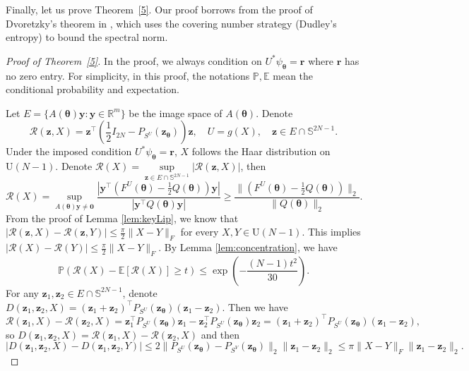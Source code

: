 \documentclass{amsart}
\theoremstyle{plain}
\theoremstyle{definition}
\theoremstyle{remark}
\newcommand{\thmref}[1]{Theorem~\ref{#1}}
\newcommand{\RR}{\mathbb{R}}
\newcommand{\PP}{\mathbb{P}}
\newcommand{\EE}{\mathbb{E}}
\begin{document}
Finally, let us prove \thmref{5}. Our proof borrows from the proof of Dvoretzky's theorem in \cite{meckes2019random}, which uses the covering number strategy (Dudley's entropy) to bound the spectral norm.
\begin{proof}[Proof of \thmref{5}]
     In the proof, we always condition on $U^*\psi_{\bm\theta}=\bm r$ where $\bm r$ has no zero entry. For simplicity, in this proof, the notations $\PP,\EE$ mean the conditional probability and expectation.  
     
     Let $E=\{A(\bm\theta)\bm{y}:\bm{y}\in\RR^{m}\}$ be the image space of $A(\bm\theta)$. Denote 
    \begin{equation}
        \label{aux}
        \mathcal{R}(\bm{z},X)=\bm{z}^\top(\frac{1}{2}I_{2N}-P_{S^U}(\bm{z}_{\bm\theta}))\bm{z},\quad U=g(X),\quad \bm{z}\in E\cap\mathbb{S}^{2N-1}.
    \end{equation}
    Under the imposed condition $U^*\psi_{\bm\theta}=\bm r$, $X$ follows the Haar distribution on $\mathrm U(N-1)$. Denote $\mathcal{R}(X)=\sup\limits_{\bm{z}\in E\cap\mathbb{S}^{2N-1}}|\mathcal{R}(\bm{z},X)|$, then 
    \begin{equation}
        \label{eq:upperbounf:R(X)}
         \mathcal{R}(X)=\sup\limits_{A(\bm\theta)\bm{y}\neq \bm 0}\frac{|\bm{y}^\top(F^U(\bm\theta)-\frac{1}{2}Q(\bm\theta))\bm{y}|}{|\bm{y}^\top Q(\bm\theta)\bm{y}|}\geq \frac{\|(F^U(\bm\theta)-\frac{1}{2}Q(\bm\theta))\|_2}{\|Q(\bm\theta)\|_2}.
    \end{equation}
    From the proof of Lemma \ref{lem:keyLip}, we know that $|\mathcal{R}(\bm{z},X)-\mathcal{R}(\bm{z},Y)|\leq\frac{\pi}{2}\|X-Y\|_F$ for every $X,Y\in \mathrm U(N-1)$. This implies $|\mathcal{R}(X)-\mathcal{R}(Y)|\leq\frac{\pi}{2}\|X-Y\|_F$. By Lemma \ref{lem:concentration}, we have
    \begin{equation}
        \label{eq:concentration for R(X)}
        \PP(\mathcal{R}(X)-\EE[\mathcal{R}(X)]\geq t)\leq \exp\left(-\frac{(N-1)t^2}{30}\right).
    \end{equation}
 For any $\bm{z}_1,\bm{z}_2\in E\cap \mathbb{S}^{2N-1}$, denote $D(\bm{z}_1,\bm{z}_2,X)=(\bm{z}_1+\bm{z}_2)^\top P_{S^U}(\bm{z}_{\bm\theta})(\bm{z}_1-\bm{z}_2)$. Then we have 
    \[\mathcal{R}(\bm{z}_1,X)-\mathcal{R}(\bm{z}_2,X)=\bm{z}_1^\top P_{S^U}(\bm{z}_{\bm\theta})\bm{z}_1-\bm{z}_2^\top P_{S^U}(\bm{z}_{\bm\theta})\bm{z}_2=(\bm{z}_1+\bm{z}_2)^\top P_{S^U}(\bm{z}_{\bm\theta})(\bm{z}_1-\bm{z}_2),\]
    so $D(\bm{z}_1,\bm{z}_2,X)=\mathcal{R}(\bm{z}_1,X)-\mathcal{R}(\bm{z}_2,X)$ and then 
    \[|D(\bm{z}_1,\bm{z}_2,X)-D(\bm{z}_1,\bm{z}_2,Y)|\leq2\|P_{S^U}(\bm{z}_{\bm\theta})-P_{S^V}(\bm{z}_{\bm\theta})\|_2\|\bm{z}_1-\bm{z}_2\|_2\leq \pi\|X-Y\|_F\|\bm{z}_1-\bm{z}_2\|_2.\]

\end{proof}
\end{document}
